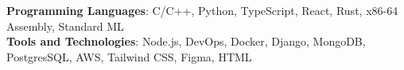 \begin{itemize}[leftmargin=0in, label={}]
    \small{\item{
     \textbf{Programming Languages}{:  C/C++, Python, TypeScript, React,
     Rust, x86-64 Assembly, Standard ML} \\
     \textbf{Tools and Technologies}{: Node.js, DevOps, Docker, Django, MongoDB,
     PostgresSQL, AWS, Tailwind
     CSS, Figma, HTML} \\
    }}
\end{itemize}